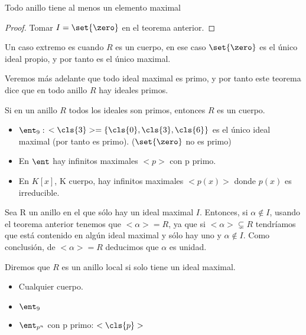 \begin{prop}
	Todo anillo tiene al menos un elemento maximal
\end{prop}
\begin{proof}
	Tomar $I=\set{\zero}$ en el teorema anterior.
\end{proof}

\obs Un caso extremo es cuando $R$ es un cuerpo, en ese caso $\set{\zero}$ es el único ideal propio, y por tanto es el único maximal.

Veremos más adelante que todo ideal maximal es primo, y por tanto este teorema dice que en todo anillo $R$ hay ideales primos.

\begin{prop}
	Si en un anillo $R$ todos los ideales son primos, entonces $R$ es un cuerpo.
\end{prop}

\begin{example}
\begin{itemize}
\item $\ent_9:$ $<\cls{3}>=\{\cls{0},\cls{3},\cls{6} \}$ es el único ideal maximal (por tanto es primo). ($\set{\zero}$ no es primo)
\item En $\ent$ hay infinitos maximales $<p>$ con p primo.
\item En $K[x]$, K cuerpo, hay infinitos maximales $<p(x)>$ donde $p(x)$ es irreducible.
\end{itemize}
\end{example}

\obs Sea R un anillo en el que sólo hay un ideal maximal $I$. Entonces, si $\alpha \notin I$, usando el teorema anterior tenemos que $<\alpha>=R$, ya que si $<\alpha>\subsetneq R$ tendríamos que está contenido en algún ideal maximal y sólo hay uno y $\alpha \notin I$. Como conclusión, de $<\alpha>=R$ deducimos que $\alpha$ es unidad.

\begin{defn}
	Diremos que $R$ es un anillo local si solo tiene un ideal maximal.
\end{defn}

\begin{example}
	\begin{itemize}
	\item Cualquier cuerpo.
	\item $\ent_9$
	\item $\ent_{p^n}$ con p primo: $<\cls{p}>$
	\end{itemize}
\end{example}


